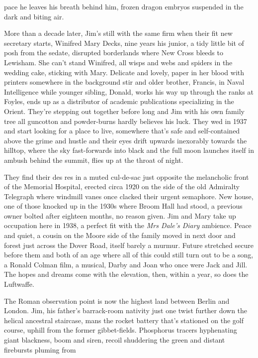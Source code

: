 \documentclass[
]{article}
\begin{document}
pace he leaves his breath behind him, frozen dragon embryos suspended in
the dark and biting air. \par
More than a decade later, Jim's still with the same firm when
their fit new secretary starts, Winifred Mary Decks, nine years his
junior, a tidy little bit of posh from the sedate, disrupted borderlands
where New Cross bleeds to Lewisham. She can't stand Winifred, all wisps
and webs and spiders in the wedding cake, sticking with Mary. Delicate
and lovely, paper in her blood with printers somewhere in the background
stir and older brother, Francis, in Naval Intelligence while younger
sibling, Donald, works his way up through the ranks at Foyles, ends up
as a distributor of academic publications specializing in the Orient.
They're stepping out together before long and Jim with his own family
tree all guncotton and powder-burns hardly believes his luck. They wed
in 1937 and start looking for a place to live, somewhere that's safe and
self-contained above the grime and hustle and their eyes drift upwards
inexorably towards the hilltop, where the sky fast-forwards into black
and the full moon launches itself in ambush behind the summit, flies up
at the throat of night. \par
They find their des res in a muted cul-de-sac just opposite the
melancholic front of the Memorial Hospital, erected circa 1920 on the
side of the old Admiralty Telegraph where windmill vanes once clacked
their urgent semaphore. New house, one of those knocked up in the 1930s
where Broom Hall had stood, a previous owner bolted after eighteen
months, no reason given. Jim and Mary take up occupation here in 1938, a
perfect fit with the \emph{Mrs Dale's Diary} ambience. Peace and quiet,
a cousin on the Moore side of the family moved in next door and forest
just across the Dover Road, itself barely a murmur. Future stretched
secure before them and both of an age where all of this could still turn
out to be a song, a Ronald Colman film, a musical, Darby and Joan who
once were Jack and Jill. The hopes and dreams come with the elevation,
then, within a year, so does the Luftwaffe. \par
The Roman observation point is now the highest land between Berlin
and London. Jim, his father's barrack-room nativity just one twist
further down the helical ancestral staircase, mans the rocket battery
that's stationed on the golf course, uphill from the former
gibbet-fields. Phosphorus tracers hyphenating giant blackness, boom and
siren, recoil shuddering the green and distant firebursts pluming from
\end{document}
